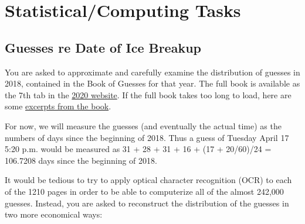 \documentclass[]{book}
\begin{document}
\hypertarget{statisticalcomputing-tasks}{%
\section{Statistical/Computing Tasks}\label{statisticalcomputing-tasks}}

\hypertarget{guesses-re-date-of-ice-breakup}{%
\subsection{Guesses re Date of Ice Breakup}\label{guesses-re-date-of-ice-breakup}}

You are asked to approximate and carefully examine the distribution of guesses in 2018, contained in the Book of Guesses for that year. The full book is available as the 7th tab in the \href{http://www.nenanaakiceclassic.com}{2020 website}. If the full book takes too long to load, here are some
\href{http://www.medicine.mcgill.ca/epidemiology/hanley/bios691/SampledPages.pdf}{excerpts from the book}.

For now, we will measure the guesses (and eventually the actual time) as the numbers of days since the beginning of 2018. Thus a guess of Tuesday April 17 5:20 p.m. would be measured as 31 + 28 + 31 + 16 + (17 + 20/60)/24 = 106.7208 days since the beginning of 2018.

It would be tedious to try to apply optical character recognition (OCR) to each of the 1210 pages in order to be able to computerize all of the almost 242,000 guesses. Instead, you are asked to reconstruct the distribution of the guesses in two more economical ways:
\end{document}
